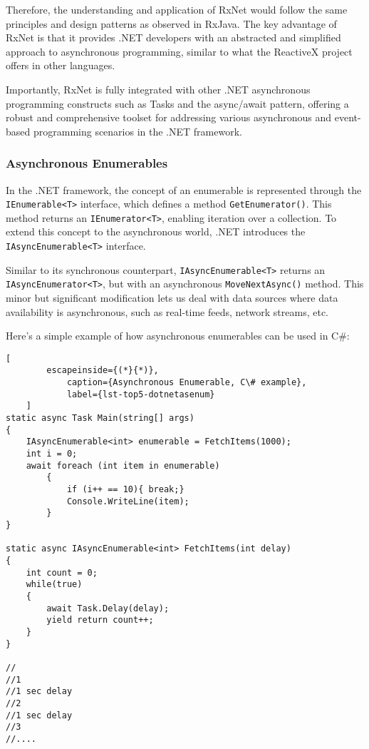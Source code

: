 Therefore, the understanding and application of RxNet would follow the same principles and design patterns as observed in RxJava. The key advantage of RxNet is that it provides .NET developers with an abstracted and simplified approach to asynchronous programming, similar to what the ReactiveX project offers in other languages.

Importantly, RxNet is fully integrated with other .NET asynchronous programming constructs such as Tasks and the async/await pattern, offering a robust and comprehensive toolset for addressing various asynchronous and event-based programming scenarios in the .NET framework.

\subsubsection{Asynchronous Enumerables}
\label{csenums}
In the .NET framework, the concept of an enumerable is represented through the \texttt{IEnumerable<T>} interface, which defines a method \texttt{GetEnumerator()}. This method returns an \texttt{IEnumerator<T>}, enabling iteration over a collection. To extend this concept to the asynchronous world, .NET introduces the \texttt{IAsyncEnumerable<T>} interface.

Similar to its synchronous counterpart, \texttt{IAsyncEnumerable<T>} returns an \texttt{IAsyncEnumerator<T>}, but with an asynchronous \texttt{MoveNextAsync()} method. This minor but significant modification lets us deal with data sources where data availability is asynchronous, such as real-time feeds, network streams, etc.

Here's a simple example of how asynchronous enumerables can be used in C\#:

\begin{center}
	\lstset{basicstyle=\scriptsize\ttfamily,frame=bottomline}
	\begin{lstlisting}[
		escapeinside={(*}{*)},
			caption={Asynchronous Enumerable, C\# example},
			label={lst-top5-dotnetasenum}
	]
static async Task Main(string[] args)
{
	IAsyncEnumerable<int> enumerable = FetchItems(1000);
	int i = 0;
	await foreach (int item in enumerable)
		{
			if (i++ == 10){ break;}
			Console.WriteLine(item);
		}
}

static async IAsyncEnumerable<int> FetchItems(int delay)
{
	int count = 0;
	while(true)
	{
		await Task.Delay(delay);
		yield return count++;
	}
}

//
//1
//1 sec delay
//2
//1 sec delay
//3
//....

	\end{lstlisting}
\end{center}

